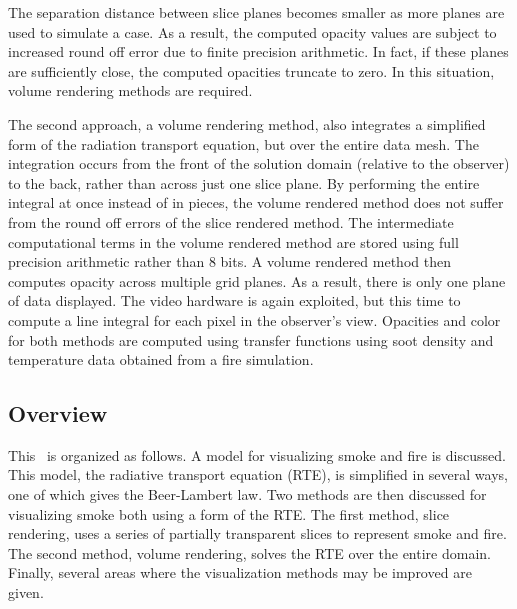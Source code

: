 The separation distance between slice planes becomes smaller as more planes are used to simulate a case.  As a result, the computed opacity values are subject to increased round off error due to finite precision arithmetic.  In fact, if these planes are sufficiently close, the computed opacities truncate to zero.   In this situation, volume rendering methods are required.

The second approach, a volume rendering method, also integrates a simplified form of the radiation transport equation, but over the entire data mesh.  The integration occurs from the front of the solution domain (relative to the observer) to the back, rather than across just one slice plane. By performing the entire integral at once instead of in pieces, the volume rendered method does not suffer from the round off errors of the slice rendered method.  The intermediate computational terms in the volume rendered method are stored using full precision arithmetic rather than 8 bits.  A volume rendered method then computes opacity across multiple grid planes.  As a result, there is only one plane of data displayed.  The video hardware is again exploited, but this time to compute a line integral for each pixel in the observer's view.  Opacities and color for both methods are computed using transfer functions using soot density and temperature data obtained from a fire simulation.

\subsection{Overview}
This \paper\ is organized as follows.  A model for visualizing smoke and fire is discussed.  This model, the radiative transport equation (RTE), is simplified in several ways, one of which gives the Beer-Lambert law.  Two methods are then discussed for visualizing smoke  both using a form of the RTE.  The first method, slice rendering,  uses a series of partially transparent slices to represent smoke and fire. The second method, volume rendering, solves the RTE over the entire domain. Finally, several areas where the visualization methods may be improved are given.


